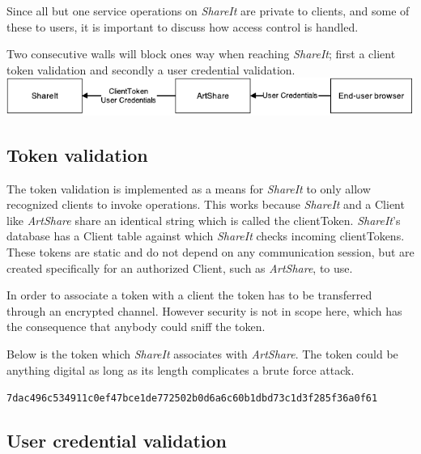 \documentclass[../report.tex]{subfiles}
\begin{document}
\graphicspath{{img/}{../img/}}


Since all but one service operations on \textit{ShareIt} are private to clients, and some of these to users, it is important to discuss how access control is handled.

Two consecutive walls will block ones way when reaching \textit{ShareIt}; first a client token validation and secondly a user credential validation. \\

\includegraphics[width=\linewidth]{./AccessControlDeployment.pdf}

\subsection{Token validation}
\label{sec:Token}

The token validation is implemented as a means for \textit{ShareIt} to only allow recognized clients to invoke operations. This works because \textit{ShareIt} and a Client like \textit{ArtShare} share an identical string which is called the clientToken. \textit{ShareIt}'s database has a Client table against which \textit{ShareIt} checks incoming clientTokens. These tokens are static and do not depend on any communication session, but are created specifically for an authorized Client, such as \textit{ArtShare}, to use.

In order to associate a token with a client the token has to be transferred through an encrypted channel. However security is not in scope here, which has the consequence that anybody could sniff the token.

Below is the token which \textit{ShareIt} associates with \textit{ArtShare}. The token could be anything digital as long as its length complicates a brute force attack.

\begin{center}
\texttt{7dac496c534911c0ef47bce1de772502b0d6a6c60b1dbd73c1d3f285f36a0f61}
\end{center}



\subsection{User credential validation}
\label{sec:UserCredential}
\end{document}
